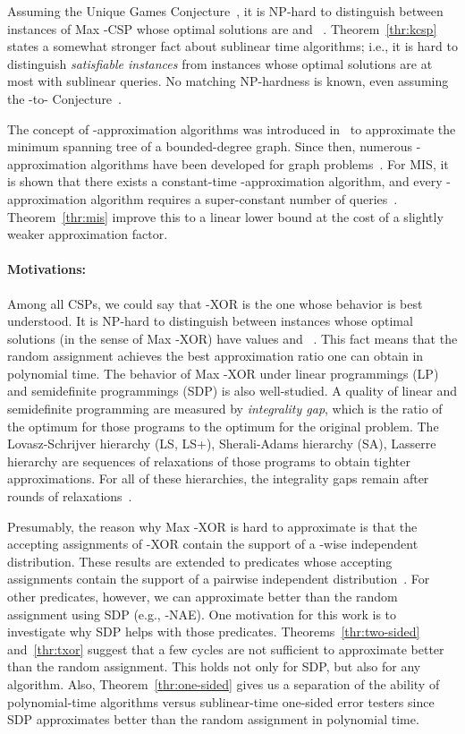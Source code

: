 \documentclass[letterpaper,11pt]{article}
\newcommand{\mis}{\textsf{MIS}\xspace}
\newcommand{\xor}{\textsf{XOR}\xspace}
\newcommand{\nae}{\textsf{NAE}\xspace}
\newcommand{\kxor}{-\textsf{XOR}\xspace}
\newcommand{\maxkcsp}{\textsf{Max -CSP}\xspace}
\newcommand{\maxkxor}{\textsf{Max -XOR}\xspace}
\begin{document}
Assuming the Unique Games Conjecture~\cite{Kho02}, 
it is NP-hard to distinguish between instances of \maxkcsp whose optimal solutions are  and ~\cite{AM08,ST06}.
Theorem~\ref{thr:kcsp} states a somewhat stronger fact about sublinear time algorithms; i.e., 
it is hard to distinguish \textit{satisfiable instances} from instances whose optimal solutions are at most  with sublinear queries.
No matching NP-hardness is known,
even assuming the -to- Conjecture~\cite{Kho02}.

The concept of -approximation algorithms was introduced in~\cite{CRT01} to approximate the minimum spanning tree of a bounded-degree graph.
Since then, 
numerous -approximation algorithms have been developed for graph problems~\cite{Alo10,CRT01,MR09,NO08,PR07,YYI09}.
For \mis, it is shown that there exists a constant-time -approximation algorithm,
and every -approximation algorithm requires a super-constant number of queries~\cite{Alo10}.
Theorem~\ref{thr:mis} improve this to a linear lower bound at the cost of a slightly weaker approximation factor.

\paragraph{Motivations:}
Among all CSPs, 
we could say that -\xor is the one whose behavior is best understood.
It is NP-hard to distinguish between instances whose optimal solutions (in the sense of \maxkxor) have values  and ~\cite{Has01}.
This fact means that the random assignment achieves the best approximation ratio one can obtain in polynomial time.
The behavior of \maxkxor under linear programmings (LP) and semidefinite programmings (SDP) is also well-studied.
A quality of linear and semidefinite programming are measured by \textit{integrality gap},
which is the ratio of the optimum for those programs to the optimum for the original problem.
The Lovasz-Schrijver hierarchy (LS, LS+), Sherali-Adams hierarchy (SA), Lasserre hierarchy are sequences of relaxations of those programs to obtain tighter approximations.
For all of these hierarchies, the integrality gaps remain  after  rounds of relaxations~\cite{BOG03,GMT09,Sch08}.

Presumably, the reason why \maxkxor is hard to approximate is that the accepting assignments of \kxor contain the support of a -wise independent distribution.
These results are extended to predicates whose accepting assignments contain the support of a pairwise independent distribution~\cite{AM08, GMT09, Tul09}.
For other predicates, however, 
we can approximate better than the random assignment using SDP (e.g., -\nae).
One motivation for this work is to investigate why SDP helps with those predicates.
Theorems~\ref{thr:two-sided} and~\ref{thr:txor} suggest that a few cycles are not sufficient to approximate better than the random assignment.
This holds not only for SDP,
but also for any algorithm.
Also, Theorem~\ref{thr:one-sided} gives us a separation of the ability of polynomial-time algorithms versus sublinear-time one-sided error testers since SDP approximates better than the random assignment in polynomial time.
\end{document}
